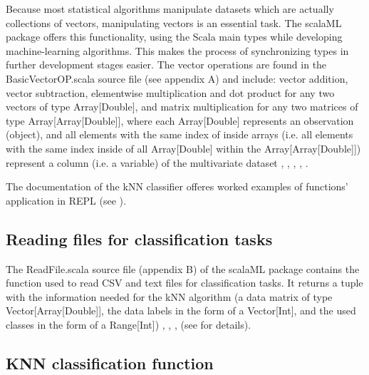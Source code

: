 \documentclass[journal]{IEEEtran}
\begin{document}
Because most statistical algorithms manipulate datasets which are actually collections of vectors, manipulating vectors is an essential task. The scalaML package offers this functionality, using the Scala main types while developing machine-learning algorithms. This makes the process of synchronizing types in further development stages easier.
 The vector operations are found in the BasicVectorOP.scala source file (see appendix A) and include: vector addition, vector subtraction, elementwise multiplication and dot product for any two vectors of type Array[Double], and matrix multiplication for any two matrices of type Array[Array[Double]], where each Array[Double] represents an observation (object), and all elements with the same index of inside arrays (i.e. all elements with the same index inside of all Array[Double] within the Array[Array[Double]]) represent a column (i.e. a variable) of the multivariate dataset \cite{dawkins_pauls_2005}, \cite{odersky_programming_2010}, \cite{swartz_learning_2015}, \cite{trask_grokking_2017}, \cite{noauthor_scala_2003}.

The documentation of the kNN classifier offeres worked examples of functions' application in REPL (see \cite{tesileanu_introduction_2017}).

\subsection{Reading files for classification tasks}

The ReadFile.scala source file (appendix B) of the scalaML package contains the function used to read CSV and text files for classification tasks. It returns a tuple with the information needed for the kNN algorithm (a data matrix of type Vector[Array[Double]], the data labels in the form of a Vector[Int],  and the used classes in the form of a Range[Int]) \cite{harrington_machine_2012}, \cite{odersky_programming_2010}, \cite{swartz_learning_2015}, \cite{noauthor_scala_2003} (see \cite{tesileanu_introduction_2017} for details).
 
\subsection{KNN classification function}
\end{document}
